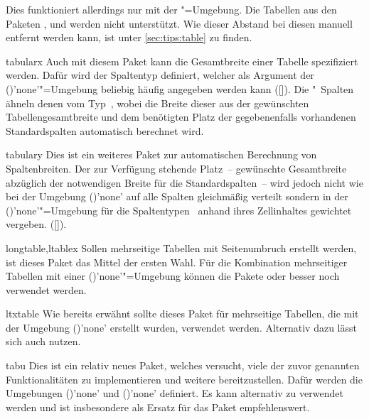 \begin{packages}
  Dies funktioniert allerdings nur mit der "=Umgebung. 
  Die Tabellen aus den Paketen ,  und 
   werden nicht unterstützt. Wie dieser Abstand bei diesen 
  manuell entfernt werden kann, ist unter \autoref{sec:tips:table} zu finden.
\item[tabularx]
  Auch mit diesem Paket kann die Gesamtbreite einer Tabelle spezifiziert 
  werden. Dafür wird der Spaltentyp  definiert, welcher als Argument 
  der ()'none'"=Umgebung beliebig 
  häufig angegeben werden kann 
  ([]). 
  Die "~Spalten ähneln denen vom Typ~, 
  wobei die Breite dieser aus der gewünschten Tabellengesamtbreite und dem 
  benötigten Platz der gegebenenfalls vorhandenen Standardspalten automatisch 
  berechnet wird.
\item[tabulary]
  Dies ist ein weiteres Paket zur automatischen Berechnung von Spaltenbreiten. 
  Der zur Verfügung stehende Platz~-- gewünschte Gesamtbreite abzüglich der 
  notwendigen Breite für die Standardspalten~-- wird jedoch nicht wie bei der 
  Umgebung ()'none' auf alle Spalten 
  gleichmäßig verteilt sondern in der 
  ()'none'"=Umgebung für die 
  Spaltentypen~ anhand ihres Zellinhaltes gewichtet vergeben. 
  ([]). 
\item[longtable,ltablex]
  Sollen mehrseitige Tabellen mit Seitenumbruch erstellt werden, ist dieses 
  Paket das Mittel der ersten Wahl. Für die Kombination mehrseitiger Tabellen 
  mit einer ()'none'"=Umgebung können 
  die Pakete  oder besser noch  verwendet 
  werden.
\item[ltxtable]
  Wie bereits erwähnt sollte dieses Paket für mehrseitige Tabellen, die mit der 
  Umgebung ()'none' erstellt wurden, 
  verwendet werden. Alternativ dazu lässt sich auch  nutzen.
\item[tabu]
  Dies ist ein relativ neues Paket, welches versucht, viele der zuvor genannten 
  Funktionalitäten zu implementieren und weitere bereitzustellen. Dafür werden 
  die Umgebungen ()'none' und 
  ()'none' definiert. Es 
  kann alternativ zu  verwendet werden und ist insbesondere 
  als Ersatz für das Paket  empfehlenswert.
  

\end{packages}
